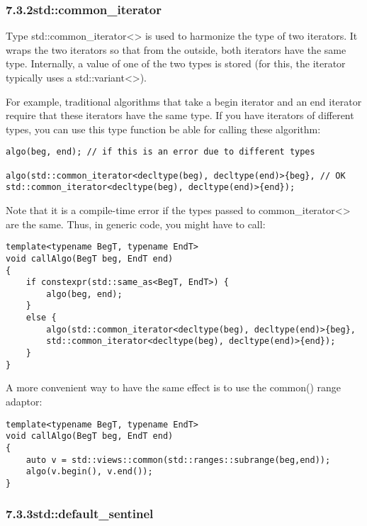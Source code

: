 \subsubsection*{ 7.3.2\hspace{0.2cm}std::common\_iterator}

Type std::common\_iterator<> is used to harmonize the type of two iterators. It wraps the two iterators so that from the outside, both iterators have the same type. Internally, a value of one of the two types is stored (for this, the iterator typically uses a std::variant<>).

For example, traditional algorithms that take a begin iterator and an end iterator require that these iterators have the same type. If you have iterators of different types, you can use this type function be able for calling these algorithm:

\begin{lstlisting}[style=styleCXX]
algo(beg, end); // if this is an error due to different types

algo(std::common_iterator<decltype(beg), decltype(end)>{beg}, // OK
std::common_iterator<decltype(beg), decltype(end)>{end});
\end{lstlisting}

Note that it is a compile-time error if the types passed to common\_iterator<> are the same. Thus, in generic code, you might have to call:

\begin{lstlisting}[style=styleCXX]
template<typename BegT, typename EndT>
void callAlgo(BegT beg, EndT end)
{
	if constexpr(std::same_as<BegT, EndT>) {
		algo(beg, end);
	}
	else {
		algo(std::common_iterator<decltype(beg), decltype(end)>{beg},
		std::common_iterator<decltype(beg), decltype(end)>{end});
	}
}
\end{lstlisting}

A more convenient way to have the same effect is to use the common() range adaptor:

\begin{lstlisting}[style=styleCXX]
template<typename BegT, typename EndT>
void callAlgo(BegT beg, EndT end)
{
	auto v = std::views::common(std::ranges::subrange(beg,end));
	algo(v.begin(), v.end());
}
\end{lstlisting}


\subsubsection*{ 7.3.3\hspace{0.2cm}std::default\_sentinel}

